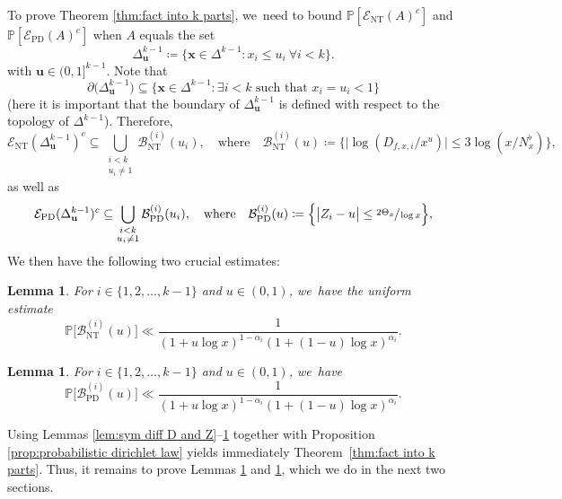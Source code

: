 \documentclass[10pt,a4paper]{amsart}
\newcommand{\bu}{{\boldsymbol u}}
\newcommand{\bx}{{\boldsymbol x}}
\newcommand{\PP}{\mathbb{P}}
\newcommand{\EC}{\mathcal{E}}
\newcommand{\simplex}{\Delta^{k-1}}
\newcommand{\bg}{\big}
\newcommand{\bgg}{\Big}
\newcommand{\ECnt}{\EC_{\mathrm{NT}}}
\newcommand{\ECprob}{\EC_{\mathrm{PD}}}
\newcommand{\Bnt}{\mathcal{B}_{\mathrm{NT}}}
\newcommand{\Bprob}{\mathcal{B}_{\mathrm{PD}}}
\theoremstyle{plain}
\newtheorem{lem}[cor]{Lemma}
\theoremstyle{definition}
\begin{document}
To prove Theorem \ref{thm:fact into k parts}, we~need to bound $\PP[\ECnt(A)^c]$ and $\PP[\ECprob(A)^c]$ when $A$ equals the set
\[
\simplex_{\mathbf{u}} \coloneqq \{\bx\in \simplex: x_i\le u_i\ \forall i<k\}.
\]
with $\bu\in(0,1]^{k-1}$. Note that
\[
\partial \bg(\simplex_{\mathbf{u}}\bg) \subseteq \{\bx \in \simplex : \exists i < k \text{ such that } x_i = u_i < 1\}
\]
(here it is important that the boundary of $\simplex_{\mathbf{u}}$ is defined with respect to the topology of $\simplex$). Therefore,
\[
\ECnt(\simplex_{\mathbf{u}})^c\subseteq\! \bigcup_{\substack{i<k \\ u_i\neq 1}} \Bnt^{(i)}(u_i),
\quad\text{where}\quad
\Bnt^{(i)}(u) \coloneqq \bgg\{ \bg| \log(D_{f,x,i}/x^u)\bg|\le 3\log(x/N_x^\flat) \bgg\},
\]
as well as
\[
\ECprob(\simplex_{\mathbf{u}})^c\subseteq \bigcup_{\substack{i< k \\ u_i\neq 1}} \Bprob^{(i)}(u_i),
\quad\text{where}\quad
\Bprob^{(i)}(u) \coloneqq \bgg\{ \bg| Z_i - u \bg|\le \sfrac{2\Theta_x}{\log x} \bgg\},
\]
We then have the following two crucial estimates:

\begin{lem}
\label{lem:bound of prob of ECnt}
For $i\in\{1,2,\dots,k-1\}$ and $u\in(0,1)$, we~have the uniform estimate
\[
\PP\bg[\Bnt^{(i)}(u) \bg] \ll \frac{1}{(1+ u\log x)^{1-\alpha_i}(1+(1-u)\log x)^{\alpha_i}}.
\]
\end{lem}

\begin{lem}
\label{lem:bound of prob of ECprob}
For $i\in\{1,2,\dots,k-1\}$ and $u\in(0,1)$, we~have
\[
\PP\bg[\Bprob^{(i)}(u) \bg] \ll \frac{1}{(1+ u\log x)^{1-\alpha_i}(1+(1-u)\log x)^{\alpha_i}}.
\]
\end{lem}

Using Lemmas \ref{lem:sym diff D and Z}--\ref{lem:bound of prob of ECprob} together with Proposition \ref{prop:probabilistic dirichlet law} yields immediately Theorem~\ref{thm:fact into k parts}. Thus, it remains to prove Lemmas \ref{lem:bound of prob of ECnt} and \ref{lem:bound of prob of ECprob}, which we do in the next two sections.
\end{document}
